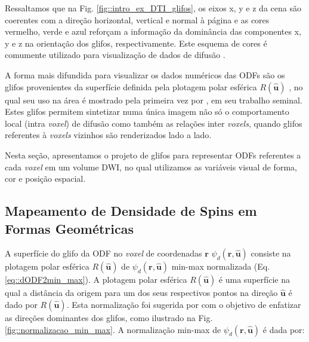 \documentclass[
    12pt,                %
    oneside,            %
    a4paper,            %
    english,            %
    french,                %
    spanish,            %
    brazil                %
    ]{abntex2}
\begin{document}
Ressaltamos que na Fig. \ref{fig::intro_ex_DTI_glifos}, os eixos x, y e z da cena são coerentes com a direção horizontal, vertical e normal à página e as cores vermelho, verde e azul reforçam a informação da dominância das componentes x, y e z na orientação dos glifos, respectivamente. Este esquema de cores é comumente utilizado para visualização de dados de difusão \cite{DTI_Handbook}.


A forma mais difundida para visualizar os dados numéricos das ODFs são os glifos provenientes da superfície definida pela plotagem polar esférica $R(\mathbf{\hat{u}})$ \cite{descoteaux2015, daducci2014, TuchQBall2004}, no qual seu uso na área é mostrado pela primeira vez por , em seu trabalho seminal. Estes glifos permitem sintetizar numa única imagem não só o comportamento local (intra \textit{voxel}) de difusão como também as relações inter \textit{voxels}, quando glifos referentes à \textit{voxels} vizinhos são renderizados lado a lado.


Nesta seção, apresentamos o projeto de glifos para representar ODFs referentes a cada \textit{voxel} em um volume DWI, no qual utilizamos as variáveis visual de forma, cor e posição espacial.

\subsection{Mapeamento de Densidade de Spins em Formas Geométricas}
\label{sec::glifos_odf}


A superfície do glifo da ODF no \textit{voxel} de coordenadas $\mathbf{r}$ $\psi_d(\mathbf{r}, \mathbf{\hat{u}})$ consiste na plotagem polar esférica $R(\mathbf{\hat{u}})$ de $\psi_d(\mathbf{r}, \mathbf{\hat{u}})$  min-max normalizada  (Eq. \ref{eq::dODF2min_max}). A plotagem polar esférica $R(\mathbf{\hat{u}})$ é uma superfície na qual a distância da origem para um dos seus respectivos pontos na direção $\mathbf{\hat{u}}$ é dado por $R(\mathbf{\hat{u}})$. Esta normalização foi sugerida por  com o objetivo de enfatizar as direções dominantes dos glifos, como ilustrado na Fig. \ref{fig::normalizacao_min_max}. A normalização min-max de $\psi_d(\mathbf{r}, \mathbf{\hat{u}})$ é dada por:
\end{document}
